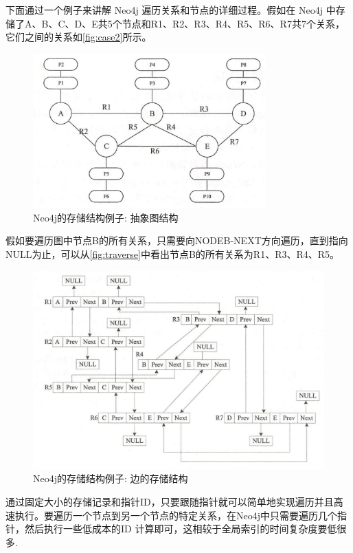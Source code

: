 下面通过一个例子来讲解 Neo4j 遍历关系和节点的详细过程。假如在 Neo4j 中存储了A、B、C、D、E共5个节点和R1、R2、R3、R4、R5、R6、R7共7个关系，它们之间的关系如\cref{fig:case2}所示。
\begin{figure}[!t]
	\centering
	\includegraphics[width=0.8\textwidth]{images/19.png}
	\caption{Neo4j的存储结构例子: 抽象图结构}
	\label{fig:neo4j-case2}
\end{figure}
假如要遍历图中节点B的所有关系，只需要向NODEB-NEXT方向遍历，直到指向NULL为止，可以从\cref{fig:traverse}中看出节点B的所有关系为R1、R3、R4、R5。
\begin{figure}[H]
	\centering
	\includegraphics[width=1\textwidth]{images/20.png}
	\caption{Neo4j的存储结构例子: 边的存储结构}
	\label{fig:neo4j-traverse }
\end{figure}
通过固定大小的存储记录和指针ID，只要跟随指针就可以简单地实现遍历并且高速执行。要遍历一个节点到另一个节点的特定关系，在Neo4j中只需要遍历几个指针，然后执行一些低成本的ID 计算即可，这相较于全局索引的时间复杂度要低很多.



